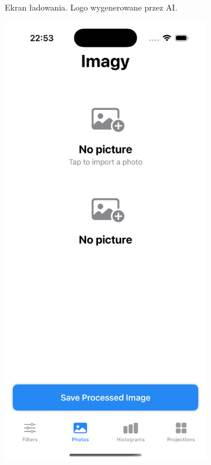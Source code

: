 \documentclass[a4paper]{article}
\begin{document}
\begin{figure}[H]
\begin{subfigure}{0.2\textwidth}
        \caption{Ekran ładowania. Logo wygenerowane przez AI.}
        \label{fig:home}
    \end{subfigure}
    \begin{subfigure}{0.2\textwidth}
        \centering
        \includegraphics[width=\linewidth]{images/image_choice.png}

\end{subfigure}
\end{figure}
\end{document}
